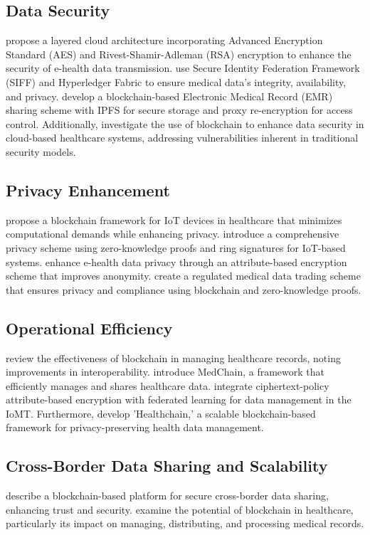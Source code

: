 \documentclass[cic,tc,english]{iiufrgs}
\begin{document}
    \subsection{Data Security} \citet{Memos2021} propose a layered cloud architecture incorporating Advanced Encryption Standard (AES) and Rivest-Shamir-Adleman (RSA) encryption to enhance the security of e-health data transmission. \citet{Tian2019} use Secure Identity Federation Framework (SIFF) and Hyperledger Fabric to ensure medical data's integrity, availability, and privacy. \citet{Liu2024} develop a blockchain-based Electronic Medical Record (EMR) sharing scheme with IPFS for secure storage and proxy re-encryption for access control. Additionally, \citet{Esposito2018} investigate the use of blockchain to enhance data security in cloud-based healthcare systems, addressing vulnerabilities inherent in traditional security models.
    
    \subsection{Privacy Enhancement} \citet{Dwivedi2019} propose a blockchain framework for IoT devices in healthcare that minimizes computational demands while enhancing privacy. \citet{Esfahani2024} introduce a comprehensive privacy scheme using zero-knowledge proofs and ring signatures for IoT-based systems. \citet{Zala2024} enhance e-health data privacy through an attribute-based encryption scheme that improves anonymity. \citet{Li2024} create a regulated medical data trading scheme that ensures privacy and compliance using blockchain and zero-knowledge proofs.
    
    \subsection{Operational Efficiency} \citet{Vazirani2019} review the effectiveness of blockchain in managing healthcare records, noting improvements in interoperability. \citet{Shen2019} introduce MedChain, a framework that efficiently manages and shares healthcare data. \citet{Bhansali2022} integrate ciphertext-policy attribute-based encryption with federated learning for data management in the IoMT. Furthermore, \citet{XuJie2019} develop 'Healthchain,' a scalable blockchain-based framework for privacy-preserving health data management.
    
    \subsection{Cross-Border Data Sharing and Scalability} \citet{Rahman2020} describe a blockchain-based platform for secure cross-border data sharing, enhancing trust and security. \citet{Saeed2022} examine the potential of blockchain in healthcare, particularly its impact on managing, distributing, and processing medical records.
    
\end{document}
